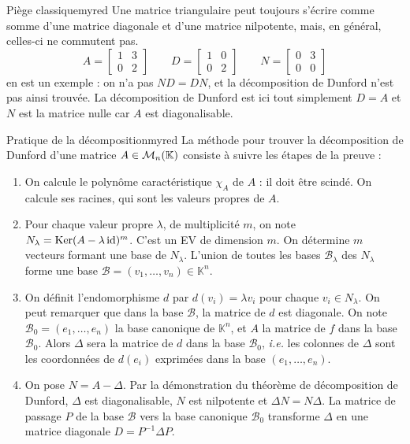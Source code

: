     \begin{omed}{Piège classique}{myred}
        Une matrice triangulaire peut toujours s’écrire comme somme d’une matrice diagonale et d’une matrice nilpotente, mais, en général, celles-ci ne commutent pas. 
        \[ A = \begin{bmatrix}
            1 & 3 \\
            0 & 2
        \end{bmatrix} \qquad D = \begin{bmatrix}
            1 & 0 \\
            0 & 2
        \end{bmatrix} \qquad N = \begin{bmatrix}
            0 & 3 \\
            0 & 0
        \end{bmatrix} \]   
        en est un exemple : on n’a pas $ND = DN$, et la décomposition de Dunford n’est pas ainsi trouvée. La décomposition de Dunford est ici tout simplement $D = A$ et $N$ est la matrice nulle car $A$ est diagonalisable.
    \end{omed}

    \begin{omed}{Pratique de la décomposition}{myred}
        La méthode pour trouver la décomposition de Dunford d’une matrice $A \in \mathcal{M}_{n}(\mathbb{K})$ consiste à suivre les étapes de la preuve : 
        \begin{enumerate}
            \item On calcule le polynôme caractéristique $\chi_A$ de $A$ : il doit être scindé. On calcule ses racines, qui sont les valeurs propres de $A$.
            \item Pour chaque valeur propre $\lambda$, de multiplicité $m$, on note $N_{\lambda} = \operatorname{Ker}(A - \lambda \operatorname{id})^m$. C’est un EV de dimension $m$. On détermine $m$ vecteurs formant une base de $N_{\lambda}$. L’union de toutes les bases $\mathcal{B}_{\lambda}$ des $N_{\lambda}$ forme une base $\mathcal{B} = (v_1,\ldots, v_n) \in \mathbb{K}^n$.
            \item On définit l’endomorphisme $d$ par $d(v_i) = \lambda v_i$ pour chaque $v_i \in N_{\lambda}$. On peut remarquer que dans la base $\mathcal{B}$, la matrice de $d$ est diagonale. On note $\mathcal{B}_0 = (e_1,\ldots,e_n)$ la base canonique de $\mathbb{K}^n$, et $A$ la matrice de $f$ dans la base $\mathcal{B}_0$. Alors $\Delta$ sera la matrice de $d$ dans la base $\mathcal{B}_0$, \textit{i.e.} les colonnes de $\Delta$ sont les coordonnées de $d(e_i)$ exprimées dans la base $(e_1,\ldots, e_n)$. 
            \item On pose $N = A - \Delta$. Par la démonstration du théorème de décomposition de Dunford, $\Delta$ est diagonalisable, $N$ est nilpotente et $\Delta N = N \Delta$. La matrice de passage $P$ de la base $\mathcal{B}$ vers la base canonique $\mathcal{B}_0$ transforme $\Delta$ en une matrice diagonale $D = P^{-1} \Delta P$.
        \end{enumerate}
    \end{omed}

